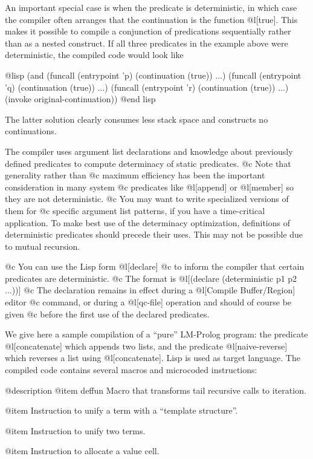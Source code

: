 {An important special case is when the predicate is deterministic,
in which case the compiler often arranges that the continuation is
the function @l[true]. This makes it possible to compile a conjunction
of predications sequentially rather than as a nested construct. If all 
three predicates in the example above were deterministic, the compiled
code would look like

@lisp
(and (funcall (entrypoint 'p) (continuation (true)) ...)
     (funcall (entrypoint 'q) (continuation (true)) ...)
     (funcall (entrypoint 'r) (continuation (true)) ...)
     (invoke original-continuation))
@end lisp


The latter solution clearly consumes less stack space and constructs no
continuations.

The compiler uses argument list declarations and knowledge about previously
defined predicates to compute determinacy of static predicates. 
@c Note that generality rather than
@c maximum efficiency has been the important consideration in many system
@c predicates like @l[append] or @l[member] so they are not deterministic.
@c You may want to write specialized versions of them for 
@c specific argument list patterns, if you have a time-critical application.
To make best use of the determinacy optimization, definitions of
deterministic predicates should precede their uses.  This may not be possible
due to mutual recursion. 

@c You can use the Lisp form @l[declare]
@c to inform the compiler that certain predicates are deterministic.
@c The format is @l[(declare (deterministic p1 p2 ...))]
@c The declaration remains in effect during a @l[Compile Buffer/Region] editor
@c command, or during a @l[qc-file] operation and should of course be given 
@c before the first use of the declared predicates.

We give here a sample compilation of a ``pure'' LM-Prolog program:
the predicate @l[concatenate] which appends two lists,
and the predicate @l[naive-reverse] which reverses a list using
@l[concatenate].  Lisp is used as target language.  The compiled code
contains several macros and microcoded instructions:

@description
@item deffun
Macro that transforms tail recursive calls to iteration.

@item %
Instruction to unify a term with a ``template structure''.

@item %
Instruction to unify two terms.

@item %
Instruction to allocate a value cell.

}
